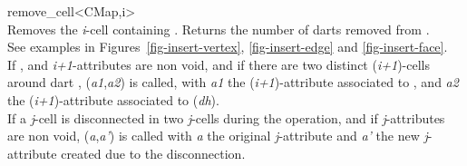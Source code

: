 \begin{ccRefFunction}{remove_cell<CMap,i>}
\\

{Removes the \emph{i}-cell containing . 
  Returns the number of darts removed from .
 \\
  See examples in Figures~\ref{fig-insert-vertex}, \ref{fig-insert-edge} and \ref{fig-insert-face}.  \\
%
   If \mylt{}, and \emph{i+1}-attributes are
   non void, and if there are two distinct (\emph{i+1})-cells around dart
   , (\emph{a1},\emph{a2}) is
   called, with \emph{a1} the (\emph{i+1})-attribute associated to ,
   and \emph{a2} the (\emph{i+1})-attribute associated to \betaipun{}(\emph{dh}).\\
   If a \emph{j}-cell is disconnected in two \emph{j}-cells during the
   operation, and if \emph{j}-attributes are non void,
   (\emph{a},\emph{a'}) is called 
   with \emph{a} the original \emph{j}-attribute and \emph{a'} the new 
   \emph{j}-attribute created due to the disconnection.
}



\end{ccRefFunction}
